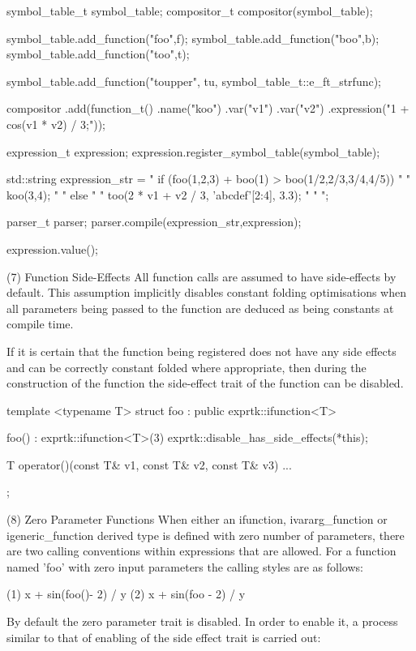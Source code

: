 symbol\_table\_t symbol\_table;
compositor\_t   compositor(symbol\_table);

symbol\_table.add\_function("foo",f);
symbol\_table.add\_function("boo",b);
symbol\_table.add\_function("too",t);

symbol\_table.add\_function("toupper",
tu,
symbol\_table\_t::e\_ft\_strfunc);

compositor
.add(function\_t()
.name("koo")
.var("v1")
.var("v2")
.expression("1 + cos(v1 * v2) / 3;"));

expression\_t expression;
expression.register\_symbol\_table(symbol\_table);

std::string expression\_str =
" if (foo(1,2,3) + boo(1) > boo(1/2,2/3,3/4,4/5)) "
"   koo(3,4);                                     "
" else                                            "
"   too(2 * v1 + v2 / 3, 'abcdef'[2:4], 3.3);     "
"                                                 ";

parser\_t parser;
parser.compile(expression\_str,expression);

expression.value();


(7) Function Side-Effects
All function calls are assumed  to have side-effects by default.  This
assumption implicitly disables constant folding optimisations when all
parameters being passed to the function are deduced as being constants
at compile time.

If it is certain that the function being registered does not have  any
side effects and can  be correctly constant folded  where appropriate,
then during the construction of the function the side-effect trait  of
the function can be disabled.

template <typename T>
struct foo : public exprtk::ifunction<T>
{
foo() : exprtk::ifunction<T>(3)
{
	exprtk::disable\_has\_side\_effects(*this);
}

T operator()(const T\& v1, const T\& v2, const T\& v3)
{ ... }
};


(8) Zero Parameter Functions
When  either  an  ifunction,  ivararg\_function  or   igeneric\_function
derived type is defined with zero number of parameters, there are  two
calling  conventions  within  expressions  that  are  allowed.  For  a
function named 'foo' with zero input parameters the calling styles are
as follows:

(1)  x + sin(foo()- 2) / y
(2)  x + sin(foo  - 2) / y


By default the  zero parameter trait  is disabled. In  order to enable
it, a process similar to that of  enabling of the side effect trait is
carried out:

